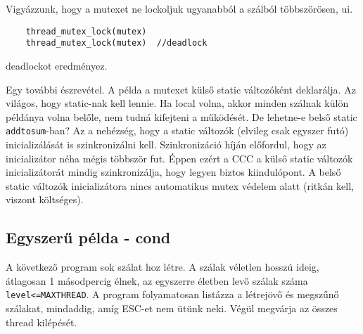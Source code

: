 Vigyázzunk, hogy a mutexet ne lockoljuk ugyanabból a szálból
többszörösen, ui.
\begin{verbatim}
    thread_mutex_lock(mutex)
    thread_mutex_lock(mutex)  //deadlock
\end{verbatim}
deadlockot eredményez.

Egy további észrevétel. 
A példa a mutexet külső static változóként deklarálja. 
Az világos, hogy static-nak kell lennie. Ha local volna, akkor minden szálnak 
külön példánya volna belőle, nem tudná kifejteni a működését. De lehetne-e
belső static \verb!addtosum!-ban? Az a nehézség, hogy a static változók 
(elvileg csak egyszer futó) inicializálását is szinkronizálni kell.
Szinkronizáció híján előfordul, hogy az inicializátor néha mégis többször fut.
Éppen ezért a CCC a külső static változók inicializátorát mindig 
szinkronizálja, hogy legyen biztos kiindulópont. A belső static változók 
inicializátora nincs automatikus mutex védelem alatt (ritkán kell, viszont költséges).








\subsection{Egyszerű példa - cond}


A következő program sok szálat hoz létre.
A szálak véletlen hosszú ideig, átlagosan 1 másodpercig élnek,
az egyszerre életben levő szálak száma \verb!level<=MAXTHREAD!.
A program folyamatosan listázza a létrejövő és megszűnő szálakat,
mindaddig, amíg ESC-et nem ütünk neki.
Végül megvárja az összes thread kilépését.

